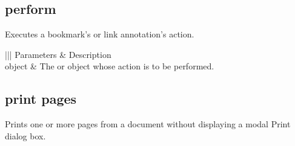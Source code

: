 \documentclass[letterpaper,12pt,english,openany,oneside]{sphinxmanual}
\begin{document}
\subsection{perform}
\label{\detokenize{IAC_API_AppleEvtObjects:perform}}
Executes a bookmark’s or link annotation’s action.

\label{\detokenize{IAC_API_AppleEvtObjects:syntax-30}}

\begin{sphinxVerbatim}[commandchars=\\\{\}]
 \PYG{p}{[}\PYG{p}{]}
\end{sphinxVerbatim}
\label{\detokenize{IAC_API_AppleEvtObjects:parameters-31}}


\begin{savenotes}\sphinxattablestart
\centering
{}\label{\detokenize{IAC_API_AppleEvtObjects:section-46}}\nobreak
\begin{tabular}[t]{|||}
\hline
\sphinxstyletheadfamily 
Parameters
&\sphinxstyletheadfamily 
Description
\\
\hline
object
&
The  or  object whose action is to be performed.
\\
\hline
\end{tabular}
\par
\sphinxattableend\end{savenotes}
\label{\detokenize{IAC_API_AppleEvtObjects:applescript-example-27}}

\begin{sphinxVerbatim}[commandchars=\\\{\}]
  
\end{sphinxVerbatim}
\label{\detokenize{IAC_API_AppleEvtObjects:apple-event-id-18}}

\begin{sphinxVerbatim}[commandchars=\\\{\}]
 
\end{sphinxVerbatim}




\subsection{print pages}
\label{\detokenize{IAC_API_AppleEvtObjects:print-pages}}
Prints one or more pages from a document without displaying a modal Print dialog box.
\end{document}
